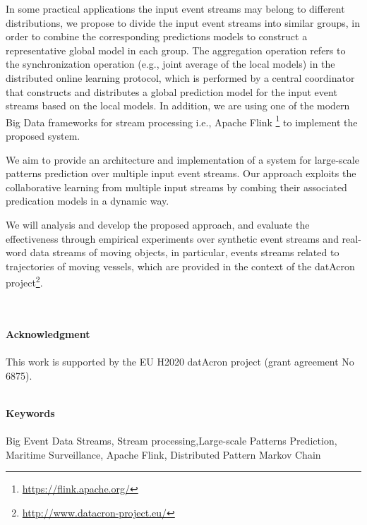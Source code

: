 \documentclass[a4paper]{article}
\theoremstyle{definition}
\begin{document}
  In some practical applications the input event streams may belong to different distributions, we propose to divide the input event streams into similar groups, in order to combine the corresponding predictions models to construct a representative global model in each group. The aggregation operation refers to the synchronization operation (e.g., joint average of the local models) in the distributed online learning protocol, which is performed by a central coordinator that constructs and distributes a global prediction model for the input event streams based on the  local models. In addition, we are using one of the modern Big Data frameworks for stream processing i.e., Apache Flink \footnote{\url{https://flink.apache.org/}} to implement the proposed system.
\par We aim to provide an architecture and implementation of a system for large-scale patterns prediction over multiple input event streams. Our approach exploits the collaborative learning from multiple input streams by combing their associated predication models in a dynamic way. 
 
\par We will analysis and develop the proposed approach, and evaluate the effectiveness through empirical experiments over synthetic event streams and real-word data streams of moving objects, in particular, events streams related to trajectories of moving vessels, which are provided in the context of the datAcron project\footnote{\url{http://www.datacron-project.eu/}}.



{\large\textbf{\\ \\ Acknowledgment\\\\}}
This work is supported by the EU H2020 datAcron project (grant agreement No 6875).

{\large\textbf{\\ Keywords\\\\}}
Big Event Data Streams, Stream processing,Large-scale Patterns Prediction, Maritime Surveillance, Apache Flink, Distributed Pattern Markov Chain\\


\setcounter{page}{1}
\thispagestyle{fancy}





\end{document}
